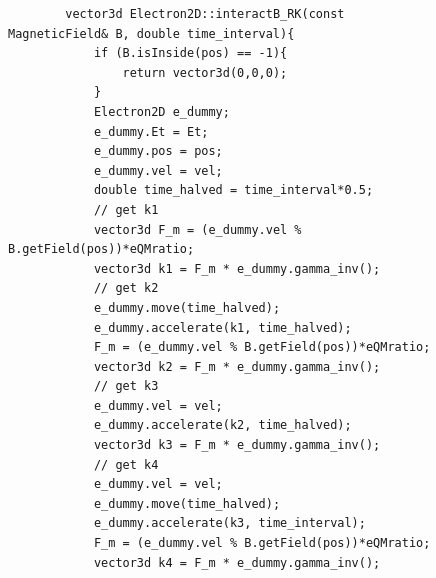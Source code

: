 \documentclass[a4paper,oneside,12pt]{report}
\numberwithin{equation}{chapter}
\begin{document}
{\begin{figure}[H]
    \centering
    \begin{verbatim}
        vector3d Electron2D::interactB_RK(const MagneticField& B, double time_interval){
            if (B.isInside(pos) == -1){
                return vector3d(0,0,0);
            }
            Electron2D e_dummy;
            e_dummy.Et = Et;
            e_dummy.pos = pos;
            e_dummy.vel = vel;
            double time_halved = time_interval*0.5;
            // get k1                                       
            vector3d F_m = (e_dummy.vel % B.getField(pos))*eQMratio;                                       
            vector3d k1 = F_m * e_dummy.gamma_inv();     
            // get k2
            e_dummy.move(time_halved);
            e_dummy.accelerate(k1, time_halved);                                              
            F_m = (e_dummy.vel % B.getField(pos))*eQMratio;                                               
            vector3d k2 = F_m * e_dummy.gamma_inv();    
            // get k3
            e_dummy.vel = vel;
            e_dummy.accelerate(k2, time_halved);
            vector3d k3 = F_m * e_dummy.gamma_inv();   
            // get k4
            e_dummy.vel = vel;
            e_dummy.move(time_halved);
            e_dummy.accelerate(k3, time_interval);                                           
            F_m = (e_dummy.vel % B.getField(pos))*eQMratio;  
            vector3d k4 = F_m * e_dummy.gamma_inv();
        

\end{verbatim}
\end{figure}}
\end{document}
